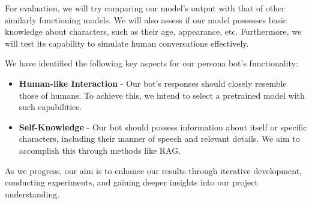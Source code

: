 \documentclass[fleqn,moreauthors,10pt]{ds_report}
\begin{document}
For evaluation, we will try comparing our model's output with that of other similarly functioning models. We will also assess if our model possesses basic knowledge about characters, such as their age, appearance, etc. Furthermore, we will test its capability to simulate human conversations effectively.

We have identified the following key aspects for our persona bot's functionality:

\begin{itemize}[label=$\bullet$]
    \item \textbf{Human-like Interaction} - Our bot's responses should closely resemble those of humans. To achieve this, we intend to select a pretrained model with such capabilities.
    \item \textbf{Self-Knowledge} - Our bot should possess information about itself or specific characters, including their manner of speech and relevant details. We aim to accomplish this through methods like RAG.
\end{itemize}

As we progress, our aim is to enhance our results through iterative development, conducting experiments, and gaining deeper insights into our project understanding.



\end{document}
